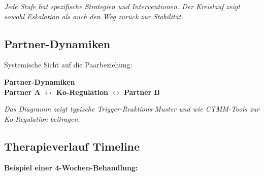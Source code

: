 \textit{Jede Stufe hat spezifische Strategien und Interventionen. Der Kreislauf zeigt sowohl Eskalation als auch den Weg zurück zur Stabilität.}

\newpage

\subsection*{\textcolor{ctmmRed}{Partner-Dynamiken}}

Systemische Sicht auf die Paarbeziehung:

\begin{center}
\begin{tcolorbox}[colback=ctmmRed!10!white,colframe=ctmmRed,width=12cm]
\centering
\textbf{Partner-Dynamiken}\\[0.5cm]
\textcolor{ctmmBlue}{\textbf{Partner A}} $\leftrightarrow$ \textcolor{ctmmGreen}{\textbf{Ko-Regulation}} $\leftrightarrow$ \textcolor{ctmmBlue}{\textbf{Partner B}}
\end{tcolorbox}
\end{center}

\textit{Das Diagramm zeigt typische Trigger-Reaktions-Muster und wie CTMM-Tools zur Ko-Regulation beitragen.}

\subsection*{\textcolor{ctmmGreen}{Therapieverlauf Timeline}}

\textbf{Beispiel einer 4-Wochen-Behandlung:}

